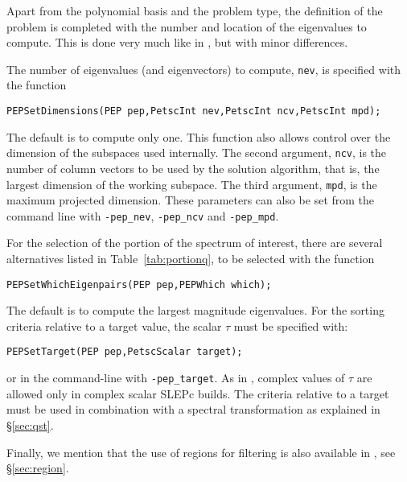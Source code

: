 Apart from the polynomial basis and the problem type, the definition of the problem is completed with the number and location of the eigenvalues to compute. This is done very much like in , but with minor differences.

The number of eigenvalues (and eigenvectors) to compute, \texttt{nev}, is specified with the function%
	\begin{Verbatim}[fontsize=\small]
	PEPSetDimensions(PEP pep,PetscInt nev,PetscInt ncv,PetscInt mpd);
	\end{Verbatim}
The default is to compute only one. This function also allows control over the dimension of the subspaces used internally. The second argument, \texttt{ncv}, is the number of column vectors to be used by the solution algorithm, that is, the largest dimension of the working subspace. The third argument, \texttt{mpd}, is the maximum projected dimension. These parameters can also be set from the command line with \Verb!-pep_nev!, \Verb!-pep_ncv! and \Verb!-pep_mpd!.

For the selection of the portion of the spectrum of interest, there are several alternatives listed in Table~\ref{tab:portionq}, to be selected with the function
	\begin{Verbatim}[fontsize=\small]
	PEPSetWhichEigenpairs(PEP pep,PEPWhich which);
	\end{Verbatim}
The default is to compute the largest magnitude eigenvalues.
For the sorting criteria relative to a target value, the scalar $\tau$ must be specified with:
	\begin{Verbatim}[fontsize=\small]
	PEPSetTarget(PEP pep,PetscScalar target);
	\end{Verbatim}
or in the command-line with \Verb!-pep_target!. As in , complex values of $\tau$ are allowed only in complex scalar SLEPc builds. The criteria relative to a target must be used in combination with a spectral transformation as explained in \S\ref{sec:qst}.

Finally, we mention that the use of regions for filtering is also available in , see \S\ref{sec:region}.

